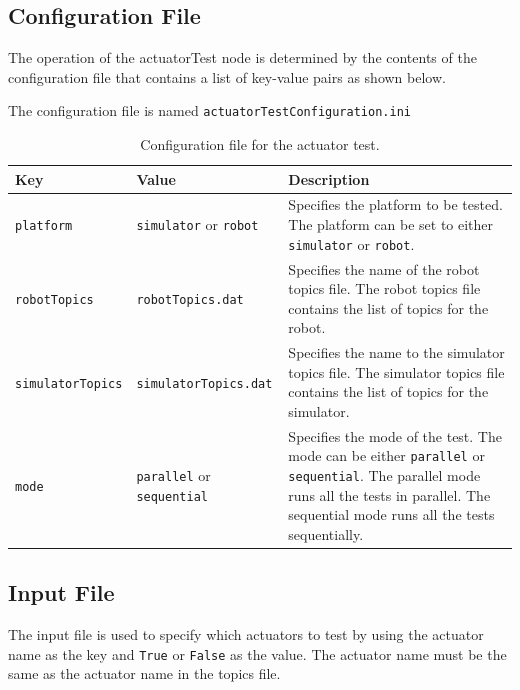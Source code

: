 \documentclass{CSSRforAfrica}
\begin{document}
\newpage

\subsection*{Configuration File}
The operation of the actuatorTest node is determined by the contents of the configuration file that contains a 
list of key-value pairs as shown below.

The configuration file is named \texttt{actuatorTestConfiguration.ini}

\begin{longtable}[c]{|l|l|p{7cm}|}
    \caption{Configuration file for the actuator test.} \label{tab:config_file}\\
    \hline
    \rowcolor{gray!30}
    \small{\textbf{Key}} & \small{\textbf{Value}} & \small{\textbf{Description}} \\ \hline
    \endhead %
    
    \small{\texttt{platform}} & \small{\texttt{simulator}} or \texttt{robot} & \small{Specifies the platform to be tested. The platform can be set to either \texttt{simulator} or \texttt{robot}.} \\ \hline
    \small{\texttt{robotTopics}} & \small{\texttt{robotTopics.dat}} & \small{Specifies the name of the robot topics file. The robot topics file contains the list of topics for the robot.} \\ \hline
    \small{\texttt{simulatorTopics}} & \small{\texttt{simulatorTopics.dat}} & \small{Specifies the name to the simulator topics file. The simulator topics file contains the list of topics for the simulator.} \\ \hline
    \small{\texttt{mode}} & \small{\texttt{parallel}} or \texttt{sequential} & \small{Specifies the mode of the test. The mode can be either \texttt{parallel} or \texttt{sequential}. The parallel mode runs all the tests in parallel. The sequential mode runs all the tests sequentially.} \\ \hline
\end{longtable}

\subsection*{Input File}
The input file is used to specify which actuators to test by using the actuator name as the key and \texttt{True} or \texttt{False} as the value.
The actuator name must be the same as the actuator name in the topics file.
\end{document}

